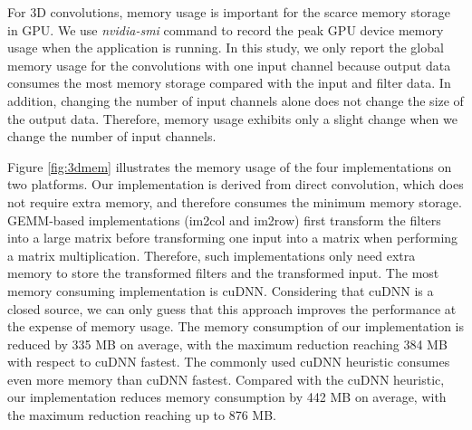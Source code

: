For 3D convolutions, memory usage is important for the scarce memory storage in GPU. We use \emph{nvidia-smi} command to record the peak GPU device memory usage when the application is running. In this study, we only report the global memory usage for the
convolutions with one input channel because output data consumes the most memory storage compared with the input and filter data. In addition, changing the number of input channels alone does not change the size of the output data. Therefore, memory usage exhibits only a slight change when we change the number of input channels.

Figure \ref{fig:3dmem} illustrates the memory usage of the four implementations on two platforms. Our implementation is derived from direct convolution, which does not require extra memory, and therefore consumes the minimum memory storage. GEMM-based implementations (im2col and im2row) first transform the filters into a large matrix before transforming one input into a matrix when performing a matrix multiplication. Therefore, such implementations only need extra memory to store the transformed filters and the transformed input. The most memory consuming
implementation is cuDNN. Considering that cuDNN is a closed source, we can only guess that this approach improves the performance at the expense of memory usage. The
memory consumption of our implementation is reduced by 335 MB on average, with the maximum reduction reaching 384 MB with respect to cuDNN fastest. The commonly used
cuDNN heuristic consumes even more memory than cuDNN fastest. Compared with the cuDNN heuristic, our implementation reduces  memory consumption by 442 MB on average, with the maximum reduction reaching up to 876 MB.

